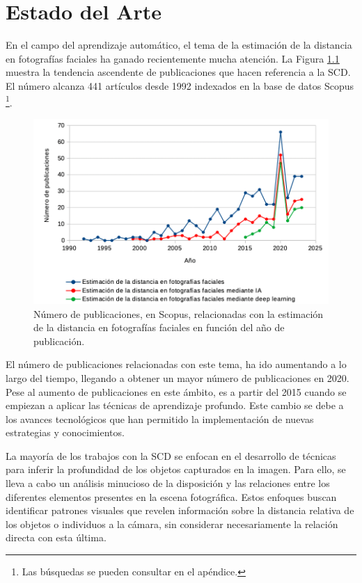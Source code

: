 \chapter{Estado del Arte}
\thispagestyle{empty}

En el campo del aprendizaje automático, el tema de la estimación de la distancia en fotografías faciales ha ganado recientemente mucha atención. La Figura \ref{fig16} muestra la tendencia ascendente de publicaciones que hacen referencia a la SCD. El número alcanza 441 artículos desde 1992 indexados en la base de datos Scopus \footnote{Las búsquedas se pueden consultar en el apéndice.}.

\begin{figure}[h]
	\centering
	\includegraphics[scale=0.8]{imagenes/cap3/grafica_scopus5.png}
	\caption[Número de publicaciones sobre la estimación de la SCD.]{Número de publicaciones, en Scopus, relacionadas con la estimación de la distancia en fotografías faciales en función del año de publicación.}
	\label{fig16}
\end{figure}

El número de publicaciones relacionadas con este tema, ha ido aumentando a lo largo del tiempo, llegando a obtener un mayor número de publicaciones en 2020. Pese al aumento de publicaciones en este ámbito, es a partir del 2015 cuando se empiezan a aplicar las técnicas de aprendizaje profundo. Este cambio se debe a los avances tecnológicos que han permitido la implementación de nuevas estrategias y conocimientos.

La mayoría de los trabajos con la SCD se enfocan en el desarrollo de técnicas para inferir la profundidad de los objetos capturados en la imagen. Para ello, se lleva a cabo un análisis minucioso de la disposición y las relaciones entre los diferentes elementos presentes en la escena fotográfica. Estos enfoques buscan identificar patrones visuales que revelen información sobre la distancia relativa de los objetos o individuos a la cámara, sin considerar necesariamente la relación directa con esta última.


